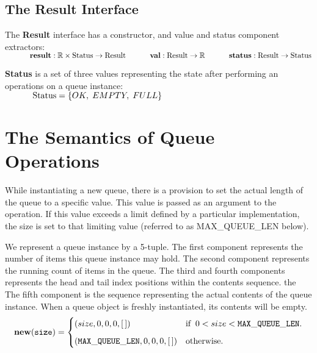 \documentclass[10pt]{article}
\begin{document}
  \subsection{The Result Interface}
  The \textbf{Result} interface has a constructor, and value and status component extractors:
  \vspace*{6pt}\\\(
  \hspace*{32pt}\textbf{result}: \mathbb{R} \times \mathrm{Status} \rightarrow \mathrm{Result}\vspace*{4pt}\\
  \hspace*{32pt}\textbf{val}: \mathrm{Result} \rightarrow \mathbb{R}\vspace*{4pt}\\
  \hspace*{32pt}\textbf{status}: \mathrm{Result} \rightarrow \mathrm{Status}
  \)\vspace*{6pt}  
  
  \textbf{Status} is a set of three values representing the state after performing an operations on a queue instance: 
   \vspace*{6pt}\\\(\hspace*{32pt}\mathrm{Status} = \{OK, \; EMPTY, \; FULL\} \)

  \section{The Semantics of Queue Operations}
    While instantiating a new queue, there is a provision to set the actual length of the queue to a specific value. This value is passed as an argument to the operation. If this value exceeds a limit defined by a particular implementation, the size is set to that limiting value (referred to as MAX\_QUEUE\_LEN below).

    We represent a queue instance by a 5-tuple. The first component represents the number of items this queue instance may hold. The second component represents the running count of items in the queue. The third and fourth components represents the head and tail index positions within the contents sequence. the The fifth component is the sequence representing the actual contents of the queue instance. When a queue object is freshly instantiated, its contents will be empty. \vspace*{3pt}\\
    \[
        \mathtt{\mathbf{new}(size)} = \begin{cases} (size, 0, 0, 0, [\,]) &\mbox{if\;\;} 0 < size < \mathtt{MAX\_QUEUE\_LEN}. \vspace*{6pt}\\ 
        (\mathtt{MAX\_QUEUE\_LEN}, 0, 0, 0, [\,]) & \mbox{otherwise}. \end{cases} 
    \]
    
\end{document}
